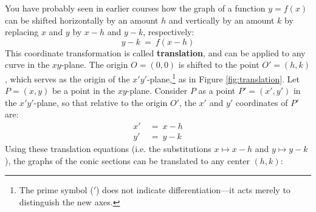 You have probably seen in earlier courses how the graph of a function $y=f(x)$
can be shifted horizontally by an amount $h$ and vertically by an amount $k$ by
replacing $x$ and $y$ by $x-h$ and $y-k$, respectively:
\[
y - k ~=~ f(x-h)
\]
This coordinate transformation is called \textbf{translation}, and can be
applied to any curve in the $xy$-plane. The origin $O=(0,0)$ is shifted to the
point $O'=(h,k)$, which serves as the origin of the $x'y'$-plane,\footnote{The
prime symbol ($'$) does not indicate differentiation---it acts merely to
distinguish the new axes.} as in Figure \ref{fig:translation}. Let $P=(x,y)$ be
a point in the $xy$-plane. Consider $P$ as a point $P'=(x',y')$ in the
$x'y'$-plane, so that relative to the origin $O'$, the $x'$ and $y'$ coordinates
of $P'$ are:
\begin{align*}
x' ~&=~ x - h\\
y' ~&=~ y - k
\end{align*}
Using these translation equations (i.e. the substitutions $x \mapsto x-h$ and
$y \mapsto y-k$), the graphs of the conic sections can be translated to any
center $(h,k)$:


